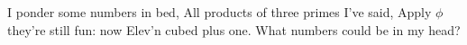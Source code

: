I ponder some numbers in bed,
All products of three primes I've said,
Apply $\phi$ they're still fun:
now Elev'n cubed plus one.
What numbers could be in my head?